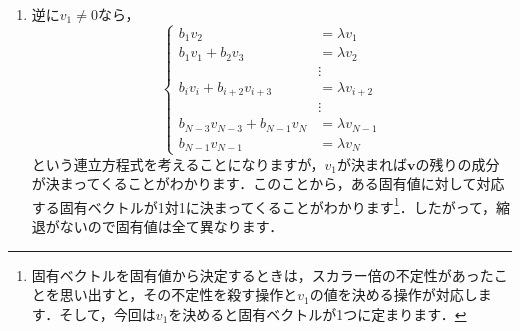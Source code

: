 \documentclass[a4paper,pdflatex,ja=standard]{bxjsarticle}
\begin{document}
\begin{enumerate}
\begin{enumerate}
    \item 
    逆に$v_1\neq 0$なら，
    \begin{equation}
      \left\{
        \begin{alignedat}{1}
          b_1 v_2 &= \lambda v_1 \\
          b_1 v_1 + b_2 v_3 &= \lambda v_2 \\
          &\vdots \\
          b_i v_i + b_{i+2} v_{i+3} &= \lambda v_{i+2} \\
          &\vdots \\
          b_{N-3} v_{N-3} + b_{N-1} v_{N} &= \lambda v_{N-1} \\
          b_{N-1} v_{N-1} &= \lambda v_{N}      
        \end{alignedat}
      \right.
    \end{equation}
    という連立方程式を考えることになりますが，$v_1$が決まれば$\bm{v}$の残りの成分が決まってくることがわかります．このことから，ある固有値に対して対応する固有ベクトルが1対1に決まってくることがわかります\footnote{
      固有ベクトルを固有値から決定するときは，スカラー倍の不定性があったことを思い出すと，その不定性を殺す操作と$v_1$の値を決める操作が対応します．そして，今回は$v_1$を決めると固有ベクトルが1つに定まります．
    }．したがって，縮退がないので固有値は全て異なります．

  \end{enumerate}

\end{enumerate}
\end{document}
